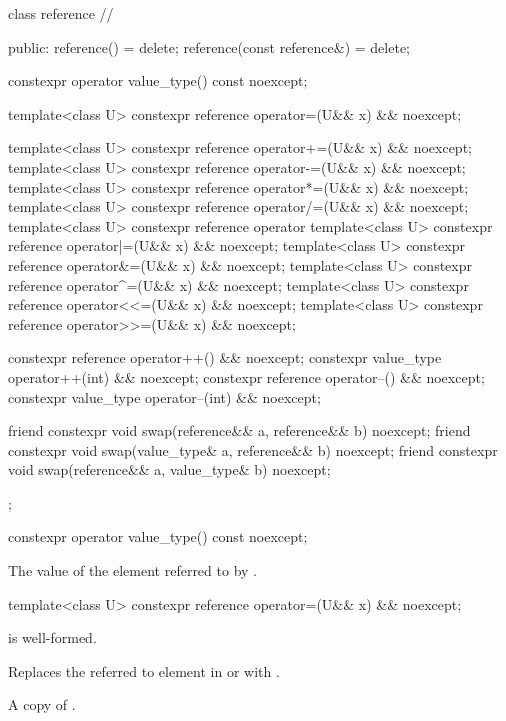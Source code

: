 \begin{codeblock}
class reference // \expos
{
public:
  reference() = delete;
  reference(const reference&) = delete;

  constexpr operator value_type() const noexcept;

  template<class U> constexpr reference operator=(U&& x) && noexcept;

  template<class U> constexpr reference operator+=(U&& x) && noexcept;
  template<class U> constexpr reference operator-=(U&& x) && noexcept;
  template<class U> constexpr reference operator*=(U&& x) && noexcept;
  template<class U> constexpr reference operator/=(U&& x) && noexcept;
  template<class U> constexpr reference operator%
  template<class U> constexpr reference operator|=(U&& x) && noexcept;
  template<class U> constexpr reference operator&=(U&& x) && noexcept;
  template<class U> constexpr reference operator^=(U&& x) && noexcept;
  template<class U> constexpr reference operator<<=(U&& x) && noexcept;
  template<class U> constexpr reference operator>>=(U&& x) && noexcept;

  constexpr reference operator++() && noexcept;
  constexpr value_type operator++(int) && noexcept;
  constexpr reference operator--() && noexcept;
  constexpr value_type operator--(int) && noexcept;

  friend constexpr void swap(reference&& a, reference&& b) noexcept;
  friend constexpr void swap(value_type& a, reference&& b) noexcept;
  friend constexpr void swap(reference&& a, value_type& b) noexcept;
};
\end{codeblock}

\begin{itemdecl}
constexpr operator value_type() const noexcept;
\end{itemdecl}

\begin{itemdescr}
  \pnum\returns
  The value of the element referred to by .
\end{itemdescr}

\begin{itemdecl}
template<class U> constexpr reference operator=(U&& x) && noexcept;
\end{itemdecl}

\begin{itemdescr}
  \pnum\constraints
   is well-formed.

  \pnum\effects
  Replaces the referred to element in  or  with .

  \pnum\returns
  A copy of .
\end{itemdescr}

